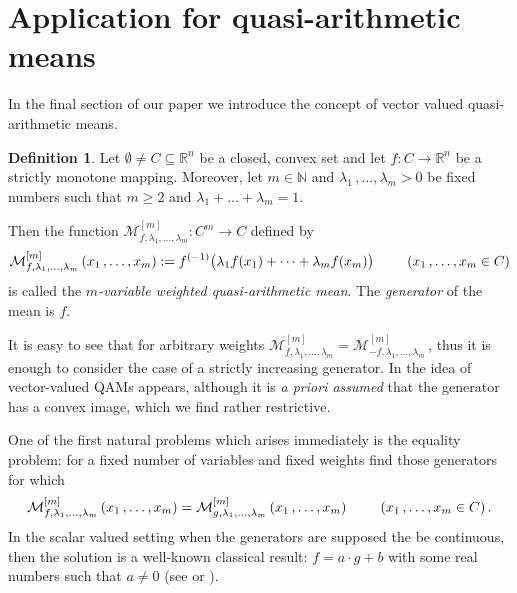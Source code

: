 \documentclass[12pt]{amsart}
\theoremstyle{remark}
\theoremstyle{definition}
\newtheorem{defin}{Definition}%
\newcommand{\NN}{\mathbb{N}}
\newcommand{\Rn}{\mathbb{R}^n}
\newcommand{\map}{\longrightarrow}
\begin{document}
\section{Application for quasi-arithmetic means}\label{Section-Appl} 

In the final section of our paper we introduce the 
concept of vector valued quasi-arithmetic means. 
\begin{defin}
Let $ \emptyset \neq C \subseteq \Rn $ be a 
closed, convex set and let $ f : C \map \Rn $ 
be a strictly monotone mapping. Moreover, 
let $ m \in \NN $ and $ \lambda_1 \,, \dots , \lambda_m > 0 $ 
be fixed numbers such that $ m \geq 2 $ and 
$ \lambda_1 + \dots + \lambda_m = 1 $. 

Then the function 
$ \mathcal{M}_{f, \lambda_1 , \dots , \lambda_m}^{[m]} 
: C^m \map C $ defined by 
\[
\mathcal{M}_{f, \lambda_1 , \dots , \lambda_m}^{[m]} 
\left( x_1 \,, \dots , x_m \right) 
:= f^{(-1)} \bigl( \lambda_1 f(x_1) + \dots 
+ \lambda_m f(x_m) \bigr) 
\hspace{8mm} 
\left( x_1 \,, \dots , x_m \in C \right) 
\] 
is called the 
{\em $ m $-variable weighted quasi-arithmetic mean}. 
The {\em generator} of the mean is $ f $. 
\end{defin}

It is easy to see that for arbitrary weights 
$ \mathcal{M}_{f, \lambda_1 , \dots , \lambda_m}^{[m]} = 
\mathcal{M}_{-f, \lambda_1 , \dots , \lambda_m}^{[m]} \, $, 
thus it is enough to consider the case of a strictly 
increasing generator. In \cite{Leo23} the idea of 
vector-valued QAMs appears, although it is 
{\em a priori assumed} that the generator has a convex image, 
which we find rather restrictive. 

One of the first natural problems which arises 
immediately is the equality problem: for a 
fixed number of variables and fixed weights find 
those generators for which 
\begin{equation}\label{eq_EqualityProblem}
\mathcal{M}_{f, \lambda_1 , \dots , \lambda_m}^{[m]} 
\left( x_1 \,, \dots , x_m \right) 
= 
\mathcal{M}_{g, \lambda_1 , \dots , \lambda_m}^{[m]} 
\left( x_1 \,, \dots , x_m \right) 
\hspace{8mm} 
\left( x_1 \,, \dots , x_m \in C \right). 
\end{equation}
In the scalar valued setting when the generators 
are supposed the be continuous, 
then the solution is a well-known classical result: 
$ f = a \cdot g + b $ with some real numbers such that 
$ a \neq 0 $ (see \cite[Theorem 83 and Section 3.7]{HLP34} 
or \cite[Theorem A]{PP26}). 
\end{document}
